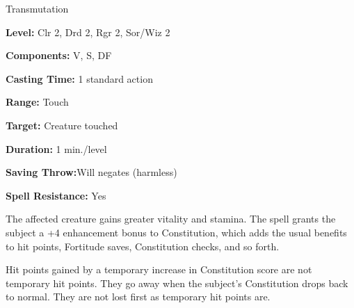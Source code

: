 
Transmutation

\textbf{Level:} Clr 2, Drd 2, Rgr 2, Sor/Wiz 2

\textbf{Components:} V, S, DF

\textbf{Casting Time:} 1 standard action

\textbf{Range:} Touch

\textbf{Target:} Creature touched

\textbf{Duration:} 1 min./level

\textbf{Saving Throw:}Will negates (harmless)

\textbf{Spell Resistance:} Yes

The affected creature gains greater vitality and stamina. The spell grants the 
subject a +4 enhancement bonus to Constitution, which adds the usual benefits to 
hit points, Fortitude saves, Constitution checks, and so forth.

Hit points gained by a temporary increase in Constitution score are not temporary 
hit points. They go away when the subject's Constitution drops back to normal. 
They are not lost first as temporary hit points are.

